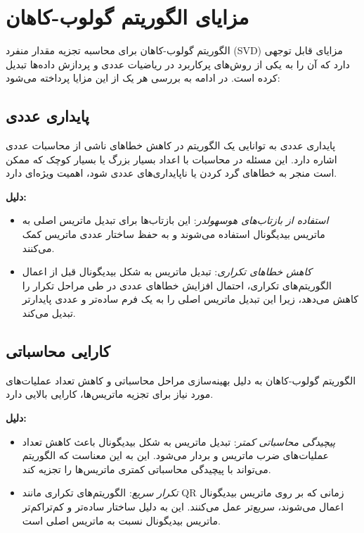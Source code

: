 \section{مزایای الگوریتم گولوب-کاهان}

الگوریتم گولوب-کاهان برای محاسبه تجزیه مقدار منفرد (SVD) مزایای قابل توجهی دارد که آن را به یکی از روش‌های پرکاربرد در ریاضیات عددی و پردازش داده‌ها تبدیل کرده است. در ادامه به بررسی هر یک از این مزایا پرداخته می‌شود:

\subsection{پایداری عددی}

پایداری عددی به توانایی یک الگوریتم در کاهش خطاهای ناشی از محاسبات عددی اشاره دارد. این مسئله در محاسبات با اعداد بسیار بزرگ یا بسیار کوچک که ممکن است منجر به خطاهای گرد کردن یا ناپایداری‌های عددی شود، اهمیت ویژه‌ای دارد.

\textbf{دلیل:}

\begin{itemize}
  \item \textit{استفاده از بازتاب‌های هوسهولدر}: این بازتاب‌ها برای تبدیل ماتریس اصلی به ماتریس بیدیگونال استفاده می‌شوند و به حفظ ساختار عددی ماتریس کمک می‌کنند.
  \item \textit{کاهش خطاهای تکراری}: تبدیل ماتریس به شکل بیدیگونال قبل از اعمال الگوریتم‌های تکراری، احتمال افزایش خطاهای عددی در طی مراحل تکرار را کاهش می‌دهد، زیرا این تبدیل ماتریس اصلی را به یک فرم ساده‌تر و عددی پایدارتر تبدیل می‌کند.
\end{itemize}

\subsection{کارایی محاسباتی}

الگوریتم گولوب-کاهان به دلیل بهینه‌سازی مراحل محاسباتی و کاهش تعداد عملیات‌های مورد نیاز برای تجزیه ماتریس‌ها، کارایی بالایی دارد.

\textbf{دلیل:}

\begin{itemize}
  \item \textit{پیچیدگی محاسباتی کمتر}: تبدیل ماتریس به شکل بیدیگونال باعث کاهش تعداد عملیات‌های ضرب ماتریس و بردار می‌شود. این به این معناست که الگوریتم می‌تواند با پیچیدگی محاسباتی کمتری ماتریس‌ها را تجزیه کند.
  \item \textit{تکرار سریع}: الگوریتم‌های تکراری مانند QR زمانی که بر روی ماتریس بیدیگونال اعمال می‌شوند، سریع‌تر عمل می‌کنند. این به دلیل ساختار ساده‌تر و کم‌تراکم‌تر ماتریس بیدیگونال نسبت به ماتریس اصلی است.
\end{itemize}

